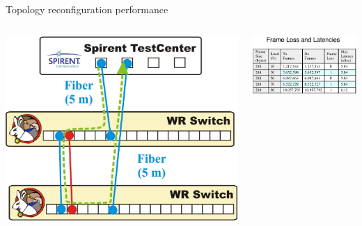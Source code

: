 \documentclass[compress,red]{beamer}
\begin{document}
\subsection{}

\begin{frame}{Topology reconfiguration performance}

\begin{columns}[c]

    \begin{center}
    \includegraphics[width=1.0\textwidth]{robustness/switchover.pdf} 
    \end{center}

    \begin{center}
    \includegraphics[width=1.0\textwidth]{robustness/switchover288-ok.pdf}
    \end{center}

\end{columns}
\end{frame}
\end{document}

